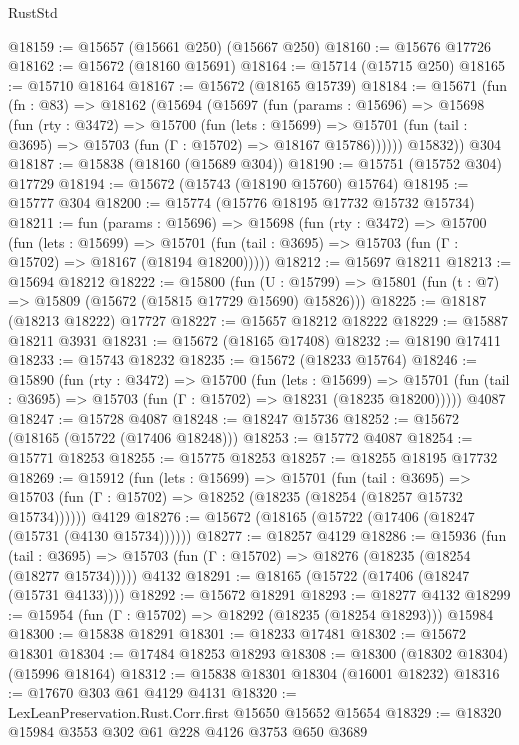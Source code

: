 \begin{lexlean}{RustStd}
\begin{coremodule}
@18159 := @15657 (@15661 @250) (@15667 @250)
@18160 := @15676 @17726
@18162 := @15672 (@18160 @15691)
@18164 := @15714 (@15715 @250)
@18165 := @15710 @18164
@18167 := @15672 (@18165 @15739)
@18184 := @15671
    (fun (fn : @83) =>
    @18162
      (@15694
        (@15697
          (fun (params : @15696) =>
          @15698
            (fun (rty : @3472) =>
            @15700
              (fun (lets : @15699) =>
              @15701 (fun (tail : @3695) => @15703 (fun (Γ : @15702) => @18167 @15786))))))
        @15832))
    @304
@18187 := @15838 (@18160 (@15689 @304))
@18190 := @15751 (@15752 @304) @17729
@18194 := @15672 (@15743 (@18190 @15760) @15764)
@18195 := @15777 @304
@18200 := @15774 (@15776 @18195 @17732 @15732 @15734)
@18211 := fun (params : @15696) =>
  @15698
    (fun (rty : @3472) =>
    @15700
      (fun (lets : @15699) =>
      @15701 (fun (tail : @3695) => @15703 (fun (Γ : @15702) => @18167 (@18194 @18200)))))
@18212 := @15697 @18211
@18213 := @15694 @18212
@18222 := @15800
    (fun (U : @15799) => @15801 (fun (t : @7) => @15809 (@15672 (@15815 @17729 @15690) @15826)))
@18225 := @18187 (@18213 @18222) @17727
@18227 := @15657 @18212 @18222
@18229 := @15887 @18211 @3931
@18231 := @15672 (@18165 @17408)
@18232 := @18190 @17411
@18233 := @15743 @18232
@18235 := @15672 (@18233 @15764)
@18246 := @15890
    (fun (rty : @3472) =>
    @15700
      (fun (lets : @15699) =>
      @15701 (fun (tail : @3695) => @15703 (fun (Γ : @15702) => @18231 (@18235 @18200)))))
    @4087
@18247 := @15728 @4087
@18248 := @18247 @15736
@18252 := @15672 (@18165 (@15722 (@17406 @18248)))
@18253 := @15772 @4087
@18254 := @15771 @18253
@18255 := @15775 @18253
@18257 := @18255 @18195 @17732
@18269 := @15912
    (fun (lets : @15699) =>
    @15701
      (fun (tail : @3695) =>
      @15703 (fun (Γ : @15702) => @18252 (@18235 (@18254 (@18257 @15732 @15734))))))
    @4129
@18276 := @15672 (@18165 (@15722 (@17406 (@18247 (@15731 (@4130 @15734))))))
@18277 := @18257 @4129
@18286 := @15936
    (fun (tail : @3695) => @15703 (fun (Γ : @15702) => @18276 (@18235 (@18254 (@18277 @15734)))))
    @4132
@18291 := @18165 (@15722 (@17406 (@18247 (@15731 @4133))))
@18292 := @15672 @18291
@18293 := @18277 @4132
@18299 := @15954 (fun (Γ : @15702) => @18292 (@18235 (@18254 @18293))) @15984
@18300 := @15838 @18291
@18301 := @18233 @17481
@18302 := @15672 @18301
@18304 := @17484 @18253 @18293
@18308 := @18300 (@18302 @18304) (@15996 @18164)
@18312 := @15838 @18301 @18304 (@16001 @18232)
@18316 := @17670 @303 @61 @4129 @4131
@18320 := LexLeanPreservation.Rust.Corr.first @15650 @15652 @15654
@18329 := @18320 @15984 @3553 @302 @61 @228 @4126 @3753 @650 @3689

\end{coremodule}
\end{lexlean}
